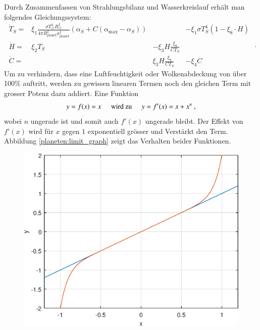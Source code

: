 \begin{refsection}
Durch Zusammenfassen von Strahlungsbilanz und Wasserkreislauf erhält man folgendes Gleichungssystem:
\begin{equation}
\begin{matrix}
\dot{T}_S = & \xi_1 \frac{\sigma T_{\astrosun}^4 R_{\astrosun}^2}{4 \pi R_{\text{planet}}^2 a_{\text{planet}}^2} (\alpha_S + C(\alpha_{\text{max}} - \alpha_S)) && - \xi_1 \sigma T_{S}^4  (1 - \xi_8 \cdot H)\\
\dot{H}   = & \xi_2 T_S              & - \xi_3 H \frac{\xi_9}{C T_S}          & \\
\dot{C}   = &                        &   \xi_3 H \frac{\xi_9}{C T_S}          & - \xi_4 C
\end{matrix} \text{ .}
\end{equation}
Um zu verhindern, dass eine Luftfeuchtigkeit oder Wolkenabdeckung von über 100\% auftritt, werden zu gewissen linearen Termen noch den gleichen Term mit grosser Potenz dazu addiert. Eine Funktion
\begin{equation}
y = f(x) = x \hspace{0.5cm}\text{wird zu}\hspace{0.5cm} y = f'(x) = x + x^n \text{ ,}
\end{equation}
wobei $n$ ungerade ist und somit auch $f'(x)$ ungerade bleibt. Der Effekt von $f'(x)$ wird für $x$ gegen $1$ exponentiell grösser und Verstärkt den Term. Abbildung \ref{planeten:limit_graph} zeigt das Verhalten beider Funktionen.
\begin{figure}[!h]
	\center
	\includegraphics[height=0.45\textheight]{planeten/Matlab/figures/limiter.eps}

\end{figure}
\end{refsection}
